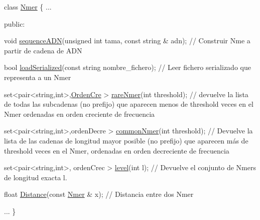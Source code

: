 \begin{DoxyCode}
\textcolor{keyword}{class }\hyperlink{classNmer}{Nmer} \{
  ...

  \textcolor{keyword}{public}:

   \textcolor{keywordtype}{void} \hyperlink{classNmer_a4c29aa3845d91b09f8e0bc3517ca4ec6}{sequenceADN}(\textcolor{keywordtype}{unsigned} \textcolor{keywordtype}{int} tama, \textcolor{keyword}{const} \textcolor{keywordtype}{string} & adn);  \textcolor{comment}{// Construir Nme a partir de cadena
       de ADN}

   \textcolor{keywordtype}{bool} \hyperlink{classNmer_a418c016bb6e04d2f699ddb694ee0221f}{loadSerialized}(\textcolor{keyword}{const} \textcolor{keywordtype}{string} nombre\_fichero); \textcolor{comment}{// Leer fichero serializado que
       representa a un Nmer }

   set<pair<string,int>,\hyperlink{classOrdenCre}{OrdenCre} > \hyperlink{classNmer_a8120d82bd305662b814bdcdb30698989}{rareNmer}(\textcolor{keywordtype}{int} threshold); \textcolor{comment}{// devuelve la lista de todas
       las subcadenas (no prefijo) que  aparecen menos de threshold veces en el Nmer ordenadas en orden creciente de
       frecuencia}

   set<pair<string,int>,ordenDecre > \hyperlink{classNmer_aabaa2a3f2761170b5cbee0e822805de8}{commonNmer}(\textcolor{keywordtype}{int} threshold); \textcolor{comment}{// Devuelve la lista de las
       cadenas de longitud mayor posible (no prefijo)  que aparecen más de threshold veces en el Nmer, ordenadas en
       orden decreciente de frecuencia}
  
   set<pair<string,int>, ordenCrec > \hyperlink{classNmer_a97de70ffe49a0457e87ed249251b9c14}{level}(\textcolor{keywordtype}{int} l); \textcolor{comment}{// Devuelve el conjunto de Nmers de longitud exacta
       l.}

   \textcolor{keywordtype}{float}  \hyperlink{classNmer_a8df2f2f355423b02413e5e29dc5639e8}{Distance}(\textcolor{keyword}{const} \hyperlink{classNmer}{Nmer} & x);  \textcolor{comment}{// Distancia entre  dos Nmer}

  ...
\}
\end{DoxyCode}


